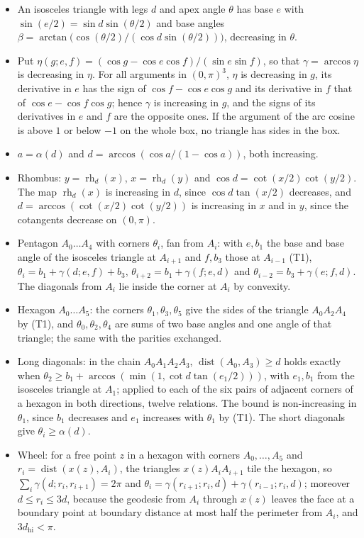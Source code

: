 \documentclass[12pt]{amsart}
\theoremstyle{definition}
\theoremstyle{plain}
\theoremstyle{definition}
\newcommand{\dist}{\operatorname{dist}}
\newcommand{\dhi}{d_{\mathrm{hi}}}
\begin{document}
\begin{itemize}
\item[(T1)] An isosceles triangle with legs $d$ and apex angle $\theta$ has base $e$ with $\sin(e/2)=\sin d\sin(\theta/2)$ and base angles $\beta=\arctan\bigl(\cos(\theta/2)/(\cos d\sin(\theta/2))\bigr)$, decreasing in $\theta$.
\item[(T2)] Put $\eta(g;e,f)=(\cos g-\cos e\cos f)/(\sin e\sin f)$, so that $\gamma=\arccos\eta$ is decreasing in $\eta$. For all arguments in $(0,\pi)^3$, $\eta$ is decreasing in $g$, its derivative in $e$ has the sign of $\cos f-\cos e\cos g$ and its derivative in $f$ that of $\cos e-\cos f\cos g$; hence $\gamma$ is increasing in $g$, and the signs of its derivatives in $e$ and $f$ are the opposite ones. If the argument of the arc cosine is above $1$ or below $-1$ on the whole box, no triangle has sides in the box.
\item[(T3)] $a=\alpha(d)$ and $d=\arccos(\cos a/(1-\cos a))$, both increasing.
\item[(T4)] Rhombus: $y=\operatorname{rh}_d(x)$, $x=\operatorname{rh}_d(y)$ and $\cos d=\cot(x/2)\cot(y/2)$. The map $\operatorname{rh}_d(x)$ is increasing in $d$, since $\cos d\tan(x/2)$ decreases, and $d=\arccos(\cot(x/2)\cot(y/2))$ is increasing in $x$ and in $y$, since the cotangents decrease on $(0,\pi)$.
\item[(T5)] Pentagon $A_0\dots A_4$ with corners $\theta_i$, fan from $A_i$: with $e,b_1$ the base and base angle of the isosceles triangle at $A_{i+1}$ and $f,b_3$ those at $A_{i-1}$ (T1), $\theta_i=b_1+\gamma(d;e,f)+b_3$, $\theta_{i+2}=b_1+\gamma(f;e,d)$ and $\theta_{i-2}=b_3+\gamma(e;f,d)$. The diagonals from $A_i$ lie inside the corner at $A_i$ by convexity.
\item[(T6)] Hexagon $A_0\dots A_5$: the corners $\theta_1,\theta_3,\theta_5$ give the sides of the triangle $A_0A_2A_4$ by (T1), and $\theta_0,\theta_2,\theta_4$ are sums of two base angles and one angle of that triangle; the same with the parities exchanged.
\item[(T7)] Long diagonals: in the chain $A_0A_1A_2A_3$, $\dist(A_0,A_3)\ge d$ holds exactly when $\theta_2\ge b_1+\arccos(\min(1,\cot d\tan(e_1/2)))$, with $e_1,b_1$ from the isosceles triangle at $A_1$; applied to each of the six pairs of adjacent corners of a hexagon in both directions, twelve relations. The bound is non-increasing in $\theta_1$, since $b_1$ decreases and $e_1$ increases with $\theta_1$ by (T1). The short diagonals give $\theta_i\ge\alpha(d)$.
\item[(T8)] Wheel: for a free point $z$ in a hexagon with corners $A_0,\dots,A_5$ and $r_i=\dist(x(z),A_i)$, the triangles $x(z)A_iA_{i+1}$ tile the hexagon, so $\sum_i\gamma(d;r_i,r_{i+1})=2\pi$ and $\theta_i=\gamma(r_{i+1};r_i,d)+\gamma(r_{i-1};r_i,d)$; moreover $d\le r_i\le3d$, because the geodesic from $A_i$ through $x(z)$ leaves the face at a boundary point at boundary distance at most half the perimeter from $A_i$, and $3\dhi<\pi$.

\end{itemize}
\end{document}
